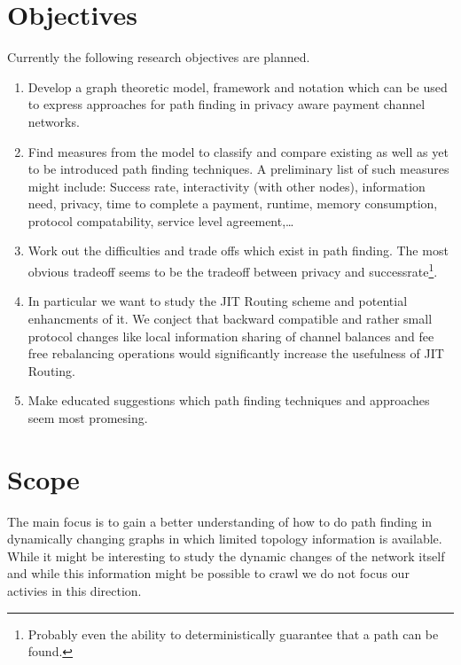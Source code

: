 \documentclass[a4paper]{paper}
\begin{document}
\section{Objectives}
Currently the following research objectives are planned.
\begin{enumerate}
\item Develop a graph theoretic model, framework and notation which can be used to express approaches for path finding in privacy aware payment channel networks.
\item Find measures from the model to classify and compare existing as well as yet to be introduced path finding techniques. A preliminary list of such measures might include: Success rate, interactivity (with other nodes), information need, privacy, time to complete a payment, runtime, memory consumption, protocol compatability, service level agreement,\dots
\item Work out the difficulties and trade offs which exist in path finding. The most obvious tradeoff seems to be the tradeoff between privacy and successrate\footnote{Probably even the ability to deterministically guarantee that a path can be found.}.
\item In particular we want to study the JIT Routing scheme and potential enhancments of it. We conject that backward compatible and rather small protocol changes like local information sharing of channel balances and fee free rebalancing operations would significantly increase the usefulness of JIT Routing.
\item Make educated suggestions which path finding techniques and approaches seem most promesing.
\end{enumerate}

\section{Scope}
The main focus is to gain a better understanding of how to do path finding in dynamically changing graphs in which limited topology information is available.
While it might be interesting to study the dynamic changes of the network itself and while this information might be possible to crawl we do not focus our activies in this direction.
\end{document}
